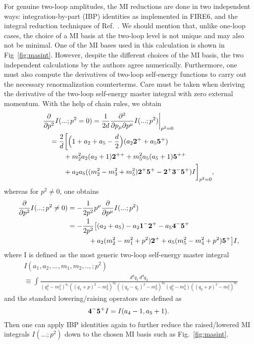 \documentclass[Physsubmission, Phys]{SciPost}
\begin{document}
For genuine two-loop amplitudes, the MI reductions are done in two independent ways: integration-by-part (IBP) identities \cite{ibp} as implemented in {\sc FIRE6}\cite{fire6}, and the integral reduction techniques of Ref.~\cite{Weiglein:1993hd}. We should mention that, unlike one-loop cases, the choice of a MI basis at the two-loop level is not unique and may also not be minimal. One of the MI bases used in this calculation is shown in Fig~\ref{fig:masint}. However, despite the different choices of the MI basis, the two independent calculations by the authors agree numerically.
Furthermore, one must also compute the derivatives of two-loop self-energy functions to carry out the necessary renormalization counterterms. Care must be taken when deriving the derivative of the two-loop self-energy master integral with zero external momentum. With the help of chain rules, we obtain
\begin{equation}
\begin{split}
&\frac\partial{\partial p^2}I(...;p^2=0)=\frac{1}{2d}\frac{\partial^2}{\partial p_{\mu}\partial p^{\mu}}I(...;p^2)\bigg|_{p^2=0}\\
                     &\quad= \frac{2}{d}\biggl[\Bigl(1+a_2+a_5-\frac{d}{2}\Bigr)(a_2 {\bold 2^+}+a_5 {\bold 5^+})\\
                     &\qquad\quad+m_2^2 a_2(a_2+1){\bold 2^{++}}+m_5^2a_5(a_5+1){\bold 5^{++}}\\
                     &\qquad\quad +a_2a_5((m_2^2-m_3^2+m_5^2){\bold{2^+5^+}}-{\bold 2^+}{\bold3^-}{\bold 5^+})I
		     \biggr]_{p^2=0},
                     \end{split}                     
\end{equation}
whereas for $p^2 \neq 0$, one obtains \cite{gz}
\begin{equation}
\begin{split}
\frac{\partial}{\partial p^2} I(...;p^2\neq 0)  &=-\frac{1}{2p^2} p^{\mu} \frac{\partial}{\partial p^{\mu}} I(...; p^2)\\
                    & = -\frac{1}{2 p^2} \bigl[(a_2 +a_5) -a_2 {\bold1^-}{\bold 2^+}-a_5 {\bold 4^-}{\bold 5^+}\\
                    &\qquad\quad +a_2(m_2^2-m_1^2+p^2){\bold 2^+}+a_5(m_5^2-m_4^2+p^2){\bold 5^+}\bigr]I,
\end{split}
\end{equation}
where I is defined as the most generic two-loop self-energy master integral
\begin{equation}
\begin{aligned}
&I(a_1,a_2,..., m_1,m_2,..,; p^2) \\
&\equiv \int \frac{d^d q_1\,d^d q_2}{(q_1^2-m_1^2)^{a_1}((q_1+p)^2-m_2^2)^{a_2}((q_2-q_1)^2-m_3^2)^{a_3}(q_2^2-m_4^2)((q_2+p)^2-m_5^2)^{a_5}}\,
\end{aligned}
\end{equation}
and the standard lowering/raising operators are defined as
\begin{equation}
 {\bold 4^-}{\bold 5^+} I =I(a_4-1,a_5+1).
\end{equation}
Then one can apply IBP identities again to further reduce the raised/lowered MI integrals $I(...;p^2)$ down to the chosen MI basis such as Fig.~\ref{fig:masint}.
\end{document}
